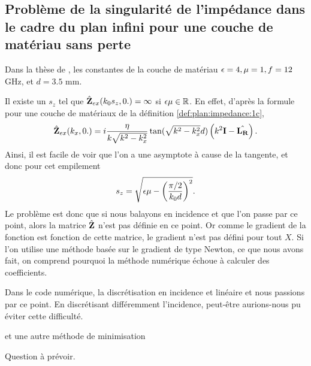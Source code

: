 \subsection{Problème de la singularité de l'impédance dans le cadre du plan infini pour une couche de matériau sans perte}

Dans la thèse de \cite{aubakirov_electromagnetic_2014}, les constantes de la couche de matériau \(\epsilon=4,\mu=1,f=12\) GHz, et \(d=3.5\) mm. 

Il existe un \(s_z\) tel que \(\hat{\mathbf{Z}}_{ex}(k_0s_z,0.) = \infty\) si \(\epsilon\mu\in\mathbb R\).
En effet, d'après la formule pour une couche de matériaux de la définition \ref{def:plan:impedance:1c}, 
\begin{equation}
  \hat{\mathbf{Z}}_{ex}(k_x,0.) = i\dfrac{\eta}{k\sqrt{k^2 - k_x^2}}\tan(\sqrt{k^2 - k_x^2}d)\left(k^2\mathbf{I} - \hat{\mathbf{L_R}}\right).
\end{equation}
Ainsi, il est facile de voir que l'on a une asymptote à cause de la tangente, et donc pour cet empilement
\begin{equation}
  \label{eq:plan:asymptote_1_couche}
  s_z = \sqrt{\epsilon \mu - \left(\dfrac{\pi/2}{k_0 d}\right)^2}.
\end{equation}
Le problème est donc que si nous balayons en incidence et que l'on passe par ce point, alors la matrice \(\hat{\mathbf{Z}}\) n'est pas définie en ce point.
Or comme le gradient de la fonction est fonction de cette matrice, le gradient n'est pas défini pour tout \(X\).
Si l'on utilise une méthode basée sur le gradient de type Newton, ce que nous avons fait, on comprend pourquoi la méthode numérique échoue à calculer des coefficients.

Dans le code numérique, la discrétisation en incidence et linéaire et nous passions par ce point.
En discrétisant différemment l'incidence, peut-être aurions-nous pu éviter cette difficulté.
\begin{REM}
et une autre méthode de minimisation
\end{REM} 
\begin{REP}
  Question à prévoir.
\end{REP}
